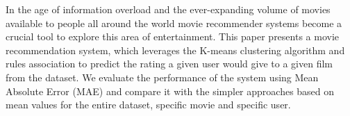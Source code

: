 In the age of information overload and the ever-expanding volume of movies available to people all around the world movie recommender systems become a crucial tool to explore this area of entertainment. This paper presents a movie recommendation system, which leverages the K-means clustering algorithm and rules association to predict the rating a given user would give to a given film from the dataset. We evaluate the performance of the system using Mean Absolute Error (MAE) and compare it with the simpler approaches based on mean values for the entire dataset, specific movie and specific user.